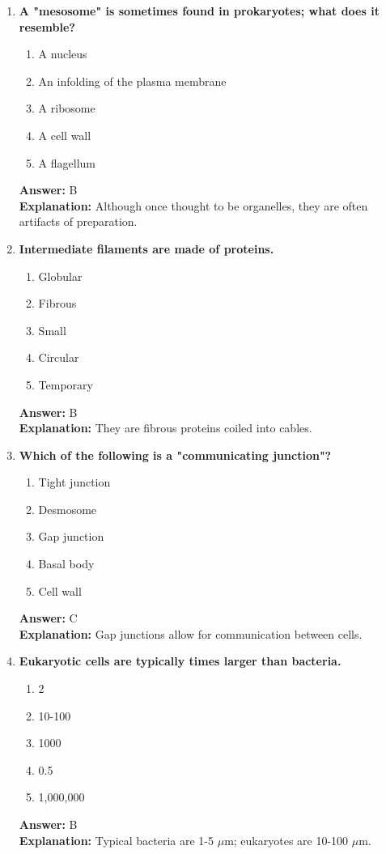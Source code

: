 \documentclass[11pt, a4paper]{article}
\begin{document}
\begin{enumerate}[leftmargin=*, label=\arabic*.]
\item \textbf{A "mesosome" is sometimes found in prokaryotes; what does it resemble?}
\begin{enumerate}[label=\Alph*.]
\item A nucleus
\item An infolding of the plasma membrane
\item A ribosome
\item A cell wall
\item A flagellum
\end{enumerate}
\textbf{Answer:} B \\
\textbf{Explanation:} Although once thought to be organelles, they are often artifacts of preparation.

\item \textbf{Intermediate filaments are made of \underline{\hspace{1cm}} proteins.}
\begin{enumerate}[label=\Alph*.]
\item Globular
\item Fibrous
\item Small
\item Circular
\item Temporary
\end{enumerate}
\textbf{Answer:} B \\
\textbf{Explanation:} They are fibrous proteins coiled into cables.

\item \textbf{Which of the following is a "communicating junction"?}
\begin{enumerate}[label=\Alph*.]
\item Tight junction
\item Desmosome
\item Gap junction
\item Basal body
\item Cell wall
\end{enumerate}
\textbf{Answer:} C \\
\textbf{Explanation:} Gap junctions allow for communication between cells.

\item \textbf{Eukaryotic cells are typically \underline{\hspace{1cm}} times larger than bacteria.}
\begin{enumerate}[label=\Alph*.]
\item 2
\item 10-100
\item 1000
\item 0.5
\item 1,000,000
\end{enumerate}
\textbf{Answer:} B \\
\textbf{Explanation:} Typical bacteria are 1-5 $\mu$m; eukaryotes are 10-100 $\mu$m.


\end{enumerate}
\end{document}
